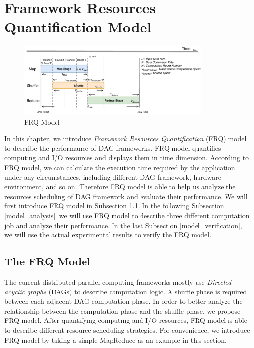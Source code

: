 {\color{blue}
\section{Framework Resources Quantification Model}\label{model}

\begin{figure}
    \centering
	\includegraphics[width=0.85\textwidth]{fig/model_basic}
	\caption{\color{blue}FRQ Model}
    \label{fig:model_basic}
    \vspace{-1em}
\end{figure}

In this chapter, we introduce \textit{Framework Resources Quantification} (FRQ) model to describe the performance of DAG frameworks.
FRQ model quantifies computing and I/O resources and displays them in time dimension. According to FRQ model, we can calculate the execution time required by the application under any circumstances, including different DAG framework, hardware environment, and so on. Therefore FRQ model is able to help us analyze the resources scheduling of DAG framework and evaluate their performance. We will first introduce FRQ model in Subsection \ref{model_overview}. In the following Subsection \ref{model_analysis}, we will use FRQ model to describe three different computation job and analyze their performance. In the last Subsection \ref{model_verification}, we will use the actual experimental results to verify the FRQ model.

\subsection{The FRQ Model}\label{model_overview}
The current distributed parallel computing frameworks mostly use \textit{Directed acyclic graphs} (DAGs) to describe computation logic. A shuffle phase is required between each adjacent DAG computation phase. In order to better analyze the relationship between the computation phase and the shuffle phase, we propose FRQ model. After quantifying computing and I/O resources, FRQ model is able to describe different resource scheduling strategies. For convenience, we introduce FRQ model by taking a simple MapReduce as an example in this section.

}
